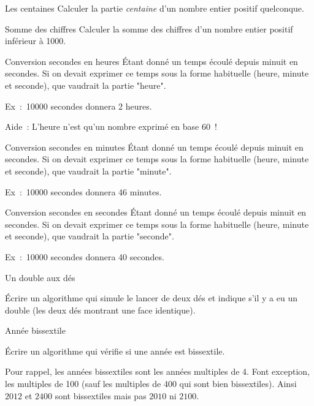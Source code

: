 	\begin{Exercice}{Les centaines}
		Calculer la partie \emph{centaine}
		d’un nombre entier positif quelconque.
	\end{Exercice}

	\begin{Exercice}{Somme des chiffres}
		Calculer la somme des chiffres
		d’un nombre entier positif inférieur à 1000.
	\end{Exercice}

	\begin{Exercice}{Conversion secondes en heures}
		Étant donné un temps écoulé depuis minuit en secondes.
		Si on devait exprimer ce temps sous la forme
		habituelle (heure, minute et seconde),
		que vaudrait la partie "heure".

		Ex~:~10000 secondes donnera 2 heures.

		Aide~: L’heure n’est qu’un nombre exprimé en base 60~!
	\end{Exercice}

	\begin{Exercice}{Conversion secondes en minutes}
		Étant donné un temps écoulé depuis minuit en secondes.
		Si on devait exprimer ce temps sous la forme
		habituelle (heure, minute et seconde),
		que vaudrait la partie "minute".

		Ex~:~10000 secondes donnera 46 minutes.
	\end{Exercice}

	\begin{Exercice}{Conversion secondes en secondes}
		Étant donné un temps écoulé depuis minuit en secondes.
		Si on devait exprimer ce temps sous la forme
		habituelle (heure, minute et seconde),
		que vaudrait la partie "seconde".

		Ex~:~10000 secondes donnera 40 secondes.
	\end{Exercice}	

	\begin{Exercice}{Un double aux dés}

		Écrire un algorithme qui simule le lancer de deux dés
		et indique s’il y a eu un double 
		(les deux dés montrant une face identique).
	\end{Exercice}

	\begin{Exercice}{Année bissextile}

		\label{ex:bissextile}
		Écrire un algorithme qui vérifie si une année est bissextile.

		Pour rappel, les années bissextiles sont les années multiples de 4. 
		Font exception, les multiples de 100 
		(sauf les multiples de 400 qui sont bien bissextiles). 
		Ainsi $2012$ et $2400$ sont bissextiles mais pas $2010$ ni $2100$.
	\end{Exercice}



